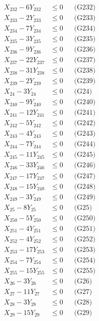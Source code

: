 \documentclass[a4paper,10pt]{article}
\begin{document}
{\begin{align}
X_{232} - 6Y_{232} &\leq 0 && \text{(G232)} \\
X_{233} - 2Y_{233} &\leq 0 && \text{(G233)} \\
X_{234} - 7Y_{234} &\leq 0 && \text{(G234)} \\
X_{235} - 3Y_{235} &\leq 0 && \text{(G235)} \\
X_{236} - 9Y_{236} &\leq 0 && \text{(G236)} \\
X_{237} - 22Y_{237} &\leq 0 && \text{(G237)} \\
X_{238} - 31Y_{238} &\leq 0 && \text{(G238)} \\
X_{239} - 2Y_{239} &\leq 0 && \text{(G239)} \\
X_{24} - 3Y_{24} &\leq 0 && \text{(G24)} \\
X_{240} - 9Y_{240} &\leq 0 && \text{(G240)} \\
X_{241} - 12Y_{241} &\leq 0 && \text{(G241)} \\
\allowbreak
X_{242} - 5Y_{242} &\leq 0 && \text{(G242)} \\
X_{243} - 4Y_{243} &\leq 0 && \text{(G243)} \\
X_{244} - 7Y_{244} &\leq 0 && \text{(G244)} \\
X_{245} - 11Y_{245} &\leq 0 && \text{(G245)} \\
X_{246} - 33Y_{246} &\leq 0 && \text{(G246)} \\
X_{247} - 17Y_{247} &\leq 0 && \text{(G247)} \\
X_{248} - 15Y_{248} &\leq 0 && \text{(G248)} \\
X_{249} - 3Y_{249} &\leq 0 && \text{(G249)} \\
X_{25} - 8Y_{25} &\leq 0 && \text{(G25)} \\
X_{250} - 5Y_{250} &\leq 0 && \text{(G250)} \\
X_{251} - 4Y_{251} &\leq 0 && \text{(G251)} \\
X_{252} - 4Y_{252} &\leq 0 && \text{(G252)} \\
X_{253} - 17Y_{253} &\leq 0 && \text{(G253)} \\
X_{254} - 7Y_{254} &\leq 0 && \text{(G254)} \\
X_{255} - 15Y_{255} &\leq 0 && \text{(G255)} \\
X_{26} - 3Y_{26} &\leq 0 && \text{(G26)} \\
X_{27} - 11Y_{27} &\leq 0 && \text{(G27)} \\
X_{28} - 3Y_{28} &\leq 0 && \text{(G28)} \\
X_{29} - 15Y_{29} &\leq 0 && \text{(G29)} \\

\end{align}}
\end{document}
